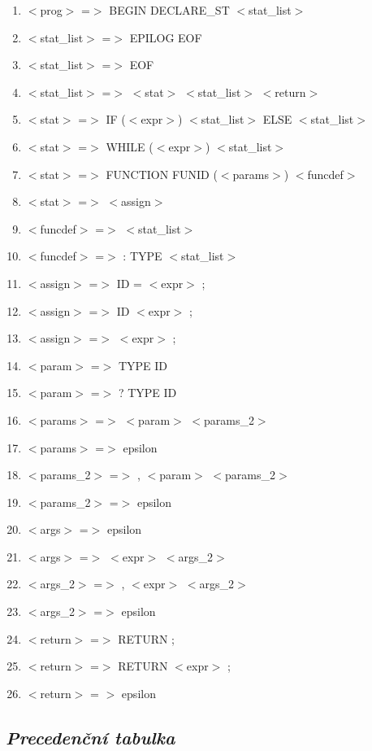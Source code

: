 \documentclass{article}
\begin{document}
\begin{enumerate}
    \item $<$prog$>$ =$>$ BEGIN DECLARE\_ST $<$stat\_list$>$
    \item $<$stat\_list$>$ =$>$ EPILOG EOF
    \item $<$stat\_list$>$ =$>$ EOF
    \item $<$stat\_list$>$ =$>$ $<$stat$>$ $<$stat\_list$>$ $<$return$>$
    \item $<$stat$>$ =$>$ IF ($<$expr$>$) {$<$stat\_list$>$} ELSE {$<$stat\_list$>$}
    \item $<$stat$>$ =$>$ WHILE ($<$expr$>$) {$<$stat\_list$>$}
    \item $<$stat$>$ =$>$ FUNCTION FUNID ($<$params$>$) $<$funcdef$>$
    \item $<$stat$>$ =$>$ $<$assign$>$
    \item $<$funcdef$>$ =$>$ {$<$stat\_list$>$}
    \item $<$funcdef$>$ =$>$ : TYPE {$<$stat\_list$>$}
    \item $<$assign$>$ =$>$ ID = $<$expr$>$ ;
    \item $<$assign$>$ =$>$ ID $<$expr$>$ ;
    \item $<$assign$>$ =$>$ $<$expr$>$ ;
    \item $<$param$>$ =$>$ TYPE ID
    \item $<$param$>$ =$>$ ? TYPE ID
    \item $<$params$>$ =$>$ $<$param$>$ $<$params\_2$>$ 
    \item $<$params$>$ =$>$ epsilon
    \item $<$params\_2$>$ =$>$ , $<$param$>$ $<$params\_2$>$ 
    \item $<$params\_2$>$ =$>$ epsilon
    \item $<$args$>$ =$>$ epsilon
    \item $<$args$>$ =$>$ $<$expr$>$ $<$args\_2$>$
    \item $<$args\_2$>$ =$>$ , $<$expr$>$ $<$args\_2$>$
    \item $<$args\_2$>$ =$>$ epsilon
    \item $<$return$>$ =$>$ RETURN ;
    \item $<$return$>$ =$>$ RETURN $<$expr$>$ ;
    \item $<$return$>$ = $>$ epsilon
\end{enumerate}

\subsection{\emph{Precedenční tabulka}}
\end{document}
